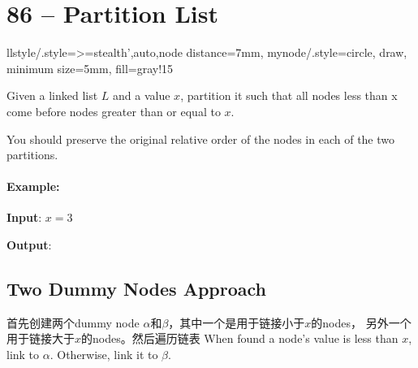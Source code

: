 \section{86 -- Partition List}
\tikzset
{
llstyle/.style={>=stealth',auto,node distance=7mm},
mynode/.style={circle, draw, minimum size=5mm, fill=gray!15}
}

Given a linked list $L$ and a value $x$, partition it such that all nodes less than x come before nodes greater than or equal to $x$.
\par
You should preserve the original relative order of the nodes in each of the two partitions.
\paragraph{Example:}
\begin{flushleft}
\textbf{Input}: $x=3$
\begin{figure}[H]
\end{figure}
\textbf{Output}:
\begin{figure}[H]
\end{figure}
\end{flushleft}
\subsection{Two Dummy Nodes Approach}
首先创建两个dummy node $\alpha$和$\beta$，其中一个是用于链接小于$x$的nodes， 另外一个用于链接大于$x$的nodes。然后遍历链表
When found a node's value is less than $x$, link to $\alpha$. Otherwise, link it to $\beta$.

